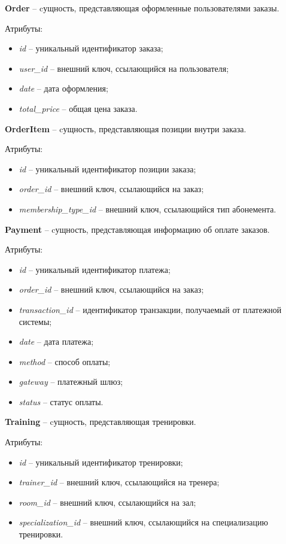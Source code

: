 \textbf{Order} -- cущность, представляющая оформленные пользователями заказы.

Атрибуты:
\begin{itemize} 
	\item \textit{id} -- уникальный идентификатор заказа; 
	\item \textit{user\_id} -- внешний ключ, ссылающийся на пользователя;
	\item \textit{date} -- дата оформления;
	\item \textit{total\_price} -- общая цена заказа. 
\end{itemize}

\textbf{OrderItem} -- cущность, представляющая позиции внутри заказа.

Атрибуты:
\begin{itemize} 
	\item \textit{id} -- уникальный идентификатор позиции заказа;
	\item \textit{order\_id} -- внешний ключ, ссылающийся на заказ;
	\item \textit{membership\_type\_id} -- внешний ключ, ссылающийся тип абонемента.
\end{itemize}

\textbf{Payment} -- cущность, представляющая информацию об оплате заказов.

Атрибуты:
\begin{itemize} 
	\item \textit{id} -- уникальный идентификатор платежа; 
	\item \textit{order\_id} -- внешний ключ, ссылающийся на заказ;
	\item \textit{transaction\_id} -- идентификатор транзакции, получаемый от платежной системы;
	\item \textit{date} -- дата платежа;
	\item \textit{method} -- способ оплаты;
	\item \textit{gateway} -- платежный шлюз;
	\item \textit{status} -- статус оплаты.
\end{itemize}

\textbf{Training} -- cущность, представляющая тренировки.

Атрибуты:
\begin{itemize} 
	\item \textit{id} -- уникальный идентификатор тренировки; 
	\item \textit{trainer\_id} -- внешний ключ, ссылающийся на тренера;
	\item \textit{room\_id} -- внешний ключ, ссылающийся на зал;
	\item \textit{specialization\_id} -- внешний ключ, ссылающийся на специализацию тренировки.
\end{itemize}

